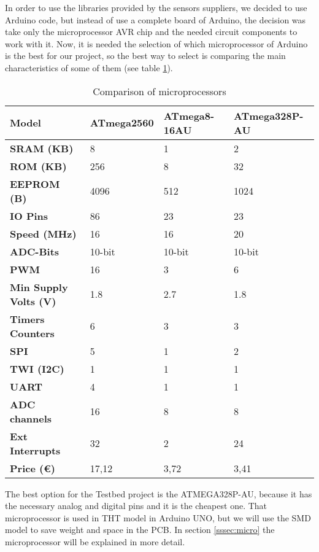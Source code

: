In order to use the libraries provided by the sensors suppliers, we decided to use Arduino code, but instead of use a complete board of Arduino, the decision was take only the microprocessor AVR chip and the needed circuit components to work with it. Now, it is needed the selection of which microprocessor of Arduino is the best for our project, so the best way to select is comparing the main characteristics of some of them (see table \ref{tab:microprocessorcompare}).
\begin{table}[H]
\centering
\begin{tabular}{ | l | l | l | l | }
\hline\hline
	\textbf{Model} & \textbf{ATmega2560} & \textbf{ATmega8-16AU} & \textbf{ATmega328P-AU} \\ \hline\hline
	\textbf{SRAM (KB) }& 8 & 1 & 2 \\ \hline
	\textbf{ROM (KB)} & 256 & 8 & 32 \\ \hline
	\textbf{EEPROM (B)} & 4096 & 512 & 1024 \\ \hline
	\textbf{IO Pins} & 86 & 23 & 23 \\ \hline
	\textbf{Speed (MHz)} & 16 & 16 & 20 \\ \hline
	\textbf{ADC-Bits} & 10-bit & 10-bit & 10-bit \\ \hline
	\textbf{PWM} & 16 & 3 & 6 \\ \hline
	\textbf{Min Supply Volts (V)} & 1.8  & 2.7  & 1.8   \\ \hline
\textbf{	Timers Counters} & 6 & 3 & 3 \\ \hline
	\textbf{SPI} & 5 & 1 & 2 \\ \hline
	\textbf{TWI (I2C)} & 1 & 1 & 1 \\ \hline
	\textbf{UART} & 4 & 1 & 1 \\ \hline
	\textbf{ADC channels} & 16 & 8 & 8 \\ \hline
	\textbf{Ext Interrupts} & 32 & 2 & 24 \\ \hline
	\textbf{Price (€)} & 17,12 & 3,72 & 3,41  \\\hline\hline
\end{tabular}\caption{Comparison of microprocessors \cite{microprocessorcompare}}\label{tab:microprocessorcompare}
\end{table}

The best option for the Testbed project is the ATMEGA328P-AU, because it has the necessary analog and digital pins and it is the cheapest one. That microprocessor is used in \acrshort{THT} model in Arduino UNO, but we will use the \acrshort{SMD} model to save weight and space in the \acrshort{PCB}. In section \ref{sssec:micro} the microprocessor will be explained in more detail.


